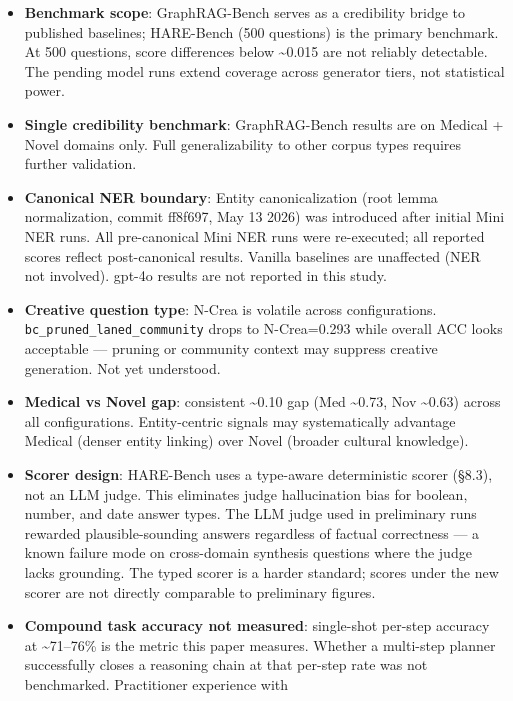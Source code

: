\documentclass[
]{article}
\providecommand{\tightlist}{%
  \setlength{\itemsep}{0pt}\setlength{\parskip}{0pt}}
\begin{document}
\begin{itemize}
\tightlist
\item
  \textbf{Benchmark scope}: GraphRAG-Bench serves as a credibility
  bridge to published baselines; HARE-Bench (500 questions) is the
  primary benchmark. At 500 questions, score differences below
  \textasciitilde0.015 are not reliably detectable. The pending model
  runs extend coverage across generator tiers, not statistical power.
\item
  \textbf{Single credibility benchmark}: GraphRAG-Bench results are on
  Medical + Novel domains only. Full generalizability to other corpus
  types requires further validation.
\item
  \textbf{Canonical NER boundary}: Entity canonicalization (root lemma
  normalization, commit ff8f697, May 13 2026) was introduced after
  initial Mini NER runs. All pre-canonical Mini NER runs were
  re-executed; all reported scores reflect post-canonical results.
  Vanilla baselines are unaffected (NER not involved). gpt-4o results
  are not reported in this study.
\item
  \textbf{Creative question type}: N-Crea is volatile across
  configurations. \texttt{bc\_pruned\_laned\_community} drops to
  N-Crea=0.293 while overall ACC looks acceptable --- pruning or
  community context may suppress creative generation. Not yet
  understood.
\item
  \textbf{Medical vs Novel gap}: consistent \textasciitilde0.10 gap (Med
  \textasciitilde0.73, Nov \textasciitilde0.63) across all
  configurations. Entity-centric signals may systematically advantage
  Medical (denser entity linking) over Novel (broader cultural
  knowledge).
\item
  \textbf{Scorer design}: HARE-Bench uses a type-aware deterministic
  scorer (§8.3), not an LLM judge. This eliminates judge hallucination
  bias for boolean, number, and date answer types. The LLM judge used in
  preliminary runs rewarded plausible-sounding answers regardless of
  factual correctness --- a known failure mode on cross-domain synthesis
  questions where the judge lacks grounding. The typed scorer is a
  harder standard; scores under the new scorer are not directly
  comparable to preliminary figures.
\item
  \textbf{Compound task accuracy not measured}: single-shot per-step
  accuracy at \textasciitilde71--76\% is the metric this paper measures.
  Whether a multi-step planner successfully closes a reasoning chain at
  that per-step rate was not benchmarked. Practitioner experience with

\end{itemize}
\end{document}
